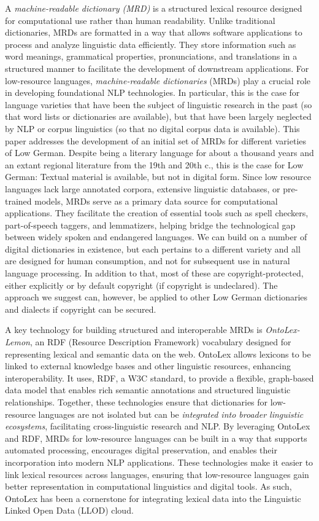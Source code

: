 \documentclass{article}
\begin{document}
A \emph{machine-readable dictionary (MRD)} is a structured lexical resource designed for computational use rather than human readability. Unlike traditional dictionaries, MRDs are formatted in a way that allows software applications to process and analyze linguistic data efficiently. They store information such as word meanings, grammatical properties, pronunciations, and translations in a structured manner to facilitate the development of downstream applications. For low-resource languages, \emph{machine-readable dictionaries} (MRDs) play a crucial role in developing foundational NLP technologies. In particular, this is the case for language varieties that have been the subject of linguistic research in the past (so that word lists or dictionaries are available), but that have been largely neglected by NLP or corpus linguistics (so that no digital corpus data is available). This paper addresses the development of an initial set of MRDs for different varieties of Low German. 
Despite being a literary language for about a thousand years and an extant regional literature from the 19th and 20th c., this is the case for Low German: Textual material is available, but not in digital form. Since low resource languages lack large annotated corpora, extensive linguistic databases, or pre-trained models, MRDs serve as a primary data source for computational applications. They facilitate the creation of essential tools such as spell checkers, part-of-speech taggers, and lemmatizers, helping bridge the technological gap between widely spoken and endangered languages. We can build on a number of digital dictionaries in existence, but each pertains to a different variety and all are designed for human consumption, and not for subsequent use in natural language processing. In addition to that, most of these are copyright-protected, either explicitly or by default copyright (if copyright is undeclared). The approach we suggest can, however, be applied to other Low German dictionaries and dialects if copyright can be secured.
    
A key technology for building structured and interoperable MRDs is \emph{OntoLex-Lemon}, an RDF (Resource Description Framework) vocabulary  designed for representing lexical and semantic data on the web. OntoLex allows lexicons to be linked to external knowledge bases and other linguistic resources, enhancing interoperability. It uses, RDF, a W3C standard, to provide a flexible, graph-based data model that enables rich semantic annotations and structured linguistic relationships. Together, these technologies ensure that dictionaries for low-resource languages are not isolated but can be \emph{integrated into broader linguistic ecosystems}, facilitating cross-linguistic research and NLP. By leveraging OntoLex and RDF, MRDs for low-resource languages can be built in a way that supports automated processing, encourages digital preservation, and enables their incorporation into modern NLP applications. These technologies make it easier to link lexical resources across languages, ensuring that low-resource languages gain better representation in computational linguistics and digital tools. As such, OntoLex has been a cornerstone for integrating lexical data into the Linguistic Linked Open Data (LLOD) cloud. 
\end{document}
